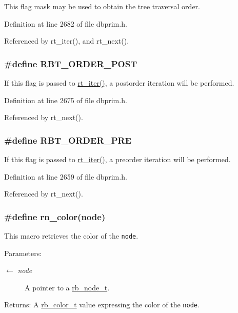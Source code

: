 This flag mask may be used to obtain the tree traversal order.

Definition at line 2682 of file dbprim.h.

Referenced by rt\_\-iter(), and rt\_\-next().\hypertarget{group__dbprim__rbtree_ga27}{
\subsubsection[RBT\_\-ORDER\_\-POST]{\setlength{\rightskip}{0pt plus 5cm}\#define RBT\_\-ORDER\_\-POST}}
\label{group__dbprim__rbtree_ga27}


If this flag is passed to \hyperlink{group__dbprim__rbtree_ga12}{rt\_\-iter()}, a postorder iteration will be performed.

Definition at line 2675 of file dbprim.h.

Referenced by rt\_\-next().\hypertarget{group__dbprim__rbtree_ga25}{
\subsubsection[RBT\_\-ORDER\_\-PRE]{\setlength{\rightskip}{0pt plus 5cm}\#define RBT\_\-ORDER\_\-PRE}}
\label{group__dbprim__rbtree_ga25}


If this flag is passed to \hyperlink{group__dbprim__rbtree_ga12}{rt\_\-iter()}, a preorder iteration will be performed.

Definition at line 2659 of file dbprim.h.

Referenced by rt\_\-next().\hypertarget{group__dbprim__rbtree_ga33}{
\subsubsection[rn\_\-color]{\setlength{\rightskip}{0pt plus 5cm}\#define rn\_\-color(node)}}
\label{group__dbprim__rbtree_ga33}


This macro retrieves the color of the {\tt node}.

\begin{Desc}
\item[Parameters:]
\begin{description}
\item[\mbox{$\leftarrow$} {\em node}]A pointer to a \hyperlink{group__dbprim__rbtree_ga1}{rb\_\-node\_\-t}.\end{description}
\end{Desc}
\begin{Desc}
\item[Returns:]A \hyperlink{group__dbprim__rbtree_ga4}{rb\_\-color\_\-t} value expressing the color of the {\tt node}.\end{Desc}


